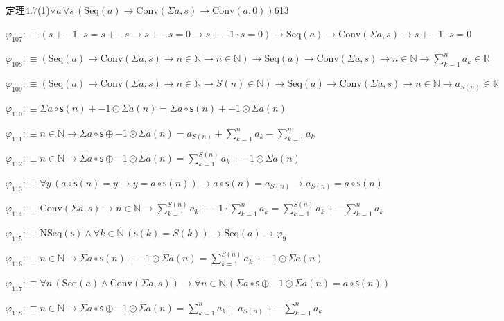 \begin{fullproof}{定理4.7(1)}{$\forall a\,\forall s\,(\mathrm{Seq}(a) \to \mathrm{Conv}(\Sigma a,s) \to \mathrm{Conv}(a,0))$}{613}
\begin{abbrevlist}
\item $\varphi_{107} :\equiv (s + -1 \cdot s = s + -s \to s + -s = 0 \to s + -1 \cdot s = 0) \to \mathrm{Seq}(a) \to \mathrm{Conv}(\Sigma a,s) \to s + -1 \cdot s = 0$
\item $\varphi_{108} :\equiv (\mathrm{Seq}(a) \to \mathrm{Conv}(\Sigma a,s) \to n \in \mathbb{N} \to n \in \mathbb{N}) \to \mathrm{Seq}(a) \to \mathrm{Conv}(\Sigma a,s) \to n \in \mathbb{N} \to {\textstyle\sum_{k=1}^{n} a_{k}} \in \mathbb{R}$
\item $\varphi_{109} :\equiv (\mathrm{Seq}(a) \to \mathrm{Conv}(\Sigma a,s) \to n \in \mathbb{N} \to S(n) \in \mathbb{N}) \to \mathrm{Seq}(a) \to \mathrm{Conv}(\Sigma a,s) \to n \in \mathbb{N} \to a_{S(n)} \in \mathbb{R}$
\item $\varphi_{110} :\equiv \Sigma a \circ \mathsf{s}(n) + -1 \odot \Sigma a(n) = \Sigma a \circ \mathsf{s}(n) + -1 \odot \Sigma a(n)$
\item $\varphi_{111} :\equiv n \in \mathbb{N} \to \Sigma a \circ \mathsf{s} \oplus -1 \odot \Sigma a(n) = a_{S(n)} + {\textstyle\sum_{k=1}^{n} a_{k}} - {\textstyle\sum_{k=1}^{n} a_{k}}$
\item $\varphi_{112} :\equiv n \in \mathbb{N} \to \Sigma a \circ \mathsf{s} \oplus -1 \odot \Sigma a(n) = {\textstyle\sum_{k=1}^{S(n)} a_{k}} + -1 \odot \Sigma a(n)$
\item $\varphi_{113} :\equiv \forall y\,(a \circ \mathsf{s}(n) = y \to y = a \circ \mathsf{s}(n)) \to a \circ \mathsf{s}(n) = a_{S(n)} \to a_{S(n)} = a \circ \mathsf{s}(n)$
\item $\varphi_{114} :\equiv \mathrm{Conv}(\Sigma a,s) \to n \in \mathbb{N} \to {\textstyle\sum_{k=1}^{S(n)} a_{k}} + -1 \cdot {\textstyle\sum_{k=1}^{n} a_{k}} = {\textstyle\sum_{k=1}^{S(n)} a_{k}} + -{\textstyle\sum_{k=1}^{n} a_{k}}$
\item $\varphi_{115} :\equiv \mathrm{NSeq}(\mathsf{s}) \land \forall k \in \mathbb{N}\,(\mathsf{s}(k) = S(k)) \to \mathrm{Seq}(a) \to \varphi_{9}$
\item $\varphi_{116} :\equiv n \in \mathbb{N} \to \Sigma a \circ \mathsf{s}(n) + -1 \odot \Sigma a(n) = {\textstyle\sum_{k=1}^{S(n)} a_{k}} + -1 \odot \Sigma a(n)$
\item $\varphi_{117} :\equiv \forall n\,(\mathrm{Seq}(a) \land \mathrm{Conv}(\Sigma a,s)) \to \forall n \in \mathbb{N}\,(\Sigma a \circ \mathsf{s} \oplus -1 \odot \Sigma a(n) = a \circ \mathsf{s}(n))$
\item $\varphi_{118} :\equiv n \in \mathbb{N} \to \Sigma a \circ \mathsf{s} \oplus -1 \odot \Sigma a(n) = {\textstyle\sum_{k=1}^{n} a_{k}} + a_{S(n)} + -{\textstyle\sum_{k=1}^{n} a_{k}}$

\end{abbrevlist}
\end{fullproof}
